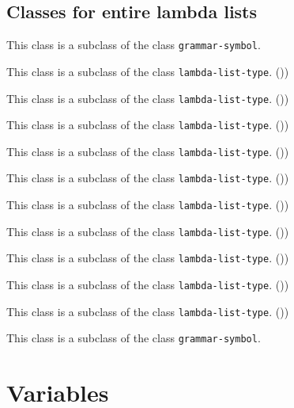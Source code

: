\subsection{Classes for entire lambda lists}


This class is a subclass of the class \texttt{grammar-symbol}.


This class is a subclass of the class \texttt{lambda-list-type}. ())


This class is a subclass of the class \texttt{lambda-list-type}. ())


This class is a subclass of the class \texttt{lambda-list-type}. ())


This class is a subclass of the class \texttt{lambda-list-type}. ())


This class is a subclass of the class \texttt{lambda-list-type}. ())


This class is a subclass of the class \texttt{lambda-list-type}. ())


This class is a subclass of the class \texttt{lambda-list-type}. ())


This class is a subclass of the class \texttt{lambda-list-type}. ())


This class is a subclass of the class \texttt{lambda-list-type}. ())


This class is a subclass of the class \texttt{lambda-list-type}. ())


This class is a subclass of the class \texttt{grammar-symbol}.

\section{Variables}

